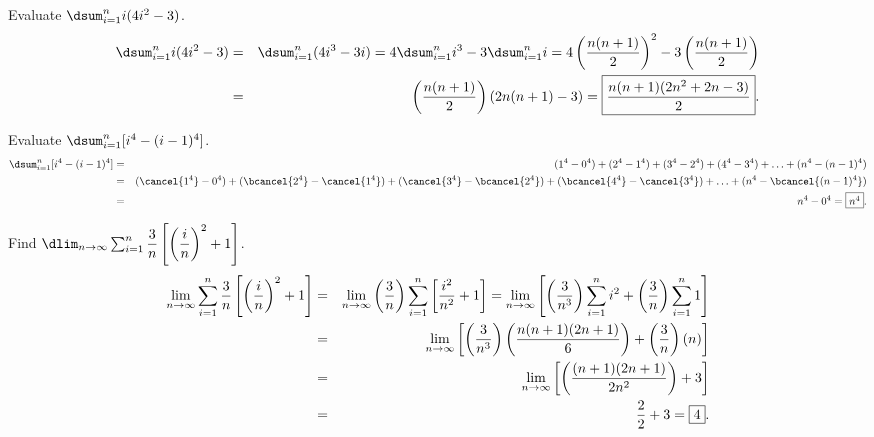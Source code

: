 \documentclass{book}
\begin{document}
\begin{Exam} Evaluate $\dsum_{i=1}^n i(4i^2-3)$.
\begin{eqnarray*}
\dsum_{i=1}^n i(4i^2-3) &=& \dsum_{i=1}^n (4i^3-3i) = 4\dsum_{i=1}^n i^3 -3\dsum_{i=1}^n i = 4\left(\dfrac{n(n+1)}{2}\right)^2 - 3\left(\dfrac{n(n+1)}{2}\right)\\
&=& \left(\dfrac{n(n+1)}{2}\right)\left(2n(n+1) - 3\right) =  \fbox{$\dfrac{n(n+1)(2n^2+2n-3)}{2}$}. 
\end{eqnarray*}
\end{Exam}\vs

\begin{Exam} Evaluate $\dsum_{i=1}^n [i^4-(i-1)^4]$.
\begin{eqnarray*}
\dsum_{i=1}^n [i^4-(i-1)^4] &=& ({1^4}-0^4) + ({2^4}-{1^4}) + ({3^4}-{2^4}) + ({4^4} - {3^4}) + \ldots + (n^4- {(n-1)^4})\\
&=& (\cancel{1^4}-0^4) + (\bcancel{2^4}-\cancel{1^4}) + (\cancel{3^4}-\bcancel{2^4}) + (\bcancel{4^4} - \cancel{3^4}) + \ldots + (n^4- \bcancel{(n-1)^4})\\
&=& n^4-0^4 = \fbox{$n^4$}.
\end{eqnarray*}
\end{Exam}\vs

\begin{Exam} Find $\dlim_{n\to \infty} \sum_{i=1}^n \dfrac{3}{n}\left[\left(\dfrac{i}{n}\right)^2+1\right]$.\\

\begin{eqnarray*}
\lim_{n\to \infty} \sum_{i=1}^n \dfrac{3}{n}\left[\left(\dfrac{i}{n}\right)^2+1\right] &=& \lim_{n\to \infty} \left(\dfrac{3}{n}\right)\sum_{i=1}^n \left[\dfrac{i^2}{n^2} + 1\right] = \lim_{n\to \infty} \left[\left(\dfrac{3}{n^3}\right)\sum_{i=1}^n i^2 + \left(\dfrac{3}{n}\right)\sum_{i=1}^n 1\right]\\
&=& \lim_{n\to \infty} \left[\left(\dfrac{3}{n^3}\right)\left(\dfrac{n(n+1)(2n+1)}{6}\right) + \left(\dfrac{3}{n}\right)(n)\right]\\ &=& \lim_{n\to \infty} \left[\left(\dfrac{(n+1)(2n+1)}{2n^2}\right) + 3\right]\\
&=& \dfrac{2}{2} + 3 = \fbox{$4$}. 
\end{eqnarray*}
\end{Exam}

\vfill
{}
\pagebreak
\end{document}
